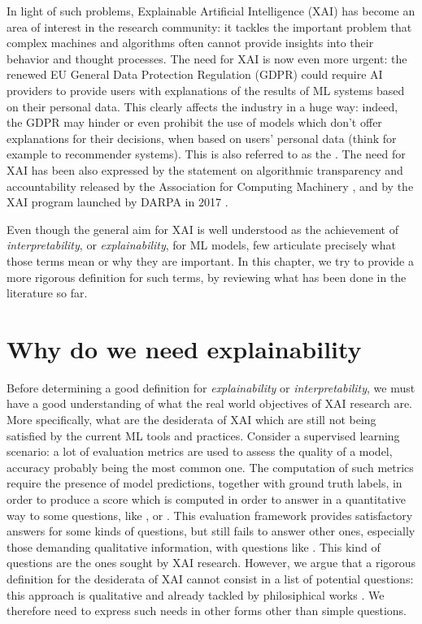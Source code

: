 In light of such problems, Explainable Artificial Intelligence (XAI) has become an area of interest in the research community: it tackles the important problem that complex machines and algorithms often cannot provide insights into their behavior and thought processes. The need for XAI is now even more urgent: the renewed EU General Data Protection Regulation (GDPR) could require AI providers to provide users with explanations of the results of ML systems based on their personal data. This clearly affects the industry in a huge way: indeed, the GDPR may hinder or even prohibit the use of  models which don't offer explanations for their decisions, when based on users' personal data (think for example to recommender systems). This is also referred to as the  \cite{goodman2017european}. The need for XAI has been also expressed by the statement on algorithmic transparency and accountability released by the Association for Computing Machinery \cite{acm2017transparency}, and by the XAI program launched by DARPA in 2017 \cite{gunning2019xai}.

Even though the general aim for XAI is well understood as the achievement of \textit{interpretability}, or \textit{explainability}, for ML models, few articulate precisely what those terms mean or why they are important. In this chapter, we try to provide a more rigorous definition for such terms, by reviewing what has been done in the literature so far. 

\section{Why do we need explainability}
\label{section:whyexpl}
Before determining a good definition for \textit{explainability} or \textit{interpretability}, we must have a good understanding of what the real world objectives of XAI research are. More specifically, what are the desiderata of XAI which are still not being satisfied by the current ML tools and practices. Consider a supervised learning scenario: a lot of evaluation metrics are used to assess the quality of a model, accuracy probably being  the most common one. The computation of such metrics require the presence of model predictions, together with ground truth labels, in order to produce a score which is computed in order to answer in a quantitative way to some questions, like , or . 
This evaluation framework provides satisfactory answers for some kinds of questions, but still fails to answer other ones, especially those demanding qualitative information, with questions like . 
This kind of questions are the ones sought by XAI research. However, we argue that a rigorous definition for the desiderata of XAI cannot consist in a list of potential questions: this approach is qualitative and already tackled by philosiphical works \cite{bromberger1992we}. We therefore need to express such needs in other forms other than simple questions. 


